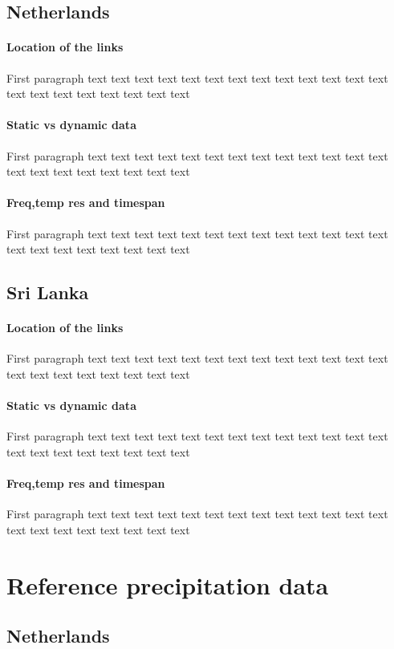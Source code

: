 \documentclass[twocolumn, 10pt, a4paper]{memoir}
\begin{document}
	\subsection{Netherlands}
		\paragraph{Location of the links}
		First paragraph 
		text text text text text text text text text text text text text text text text text text text text text
		\paragraph{Static vs dynamic data}
		First paragraph 
		text text text text text text text text text text text text text text text text text text text text text
		\paragraph{Freq,temp res and timespan}
		First paragraph 
		text text text text text text text text text text text text text text text text text text text text text
	\subsection{Sri Lanka}
		\paragraph{Location of the links}
		First paragraph 
		text text text text text text text text text text text text text text text text text text text text text
		\paragraph{Static vs dynamic data}
		First paragraph 
		text text text text text text text text text text text text text text text text text text text text text
		\paragraph{Freq,temp res and timespan}
		First paragraph 
		text text text text text text text text text text text text text text text text text text text text text

\section{Reference precipitation data}
	\subsection{Netherlands}
\end{document}
